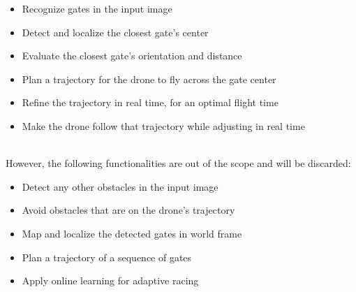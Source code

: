 \begin{itemize}
	\item{Recognize gates in the input image}
	\item{Detect and localize the closest gate's center}
	\item{Evaluate the closest gate's orientation and distance}
	\item{Plan a trajectory for the drone to fly across the gate center}
	\item{Refine the trajectory in real time, for an optimal flight time}
	\item{Make the drone follow that trajectory while adjusting in real time}
\end{itemize}
~\\
However, the following functionalities are out of the scope and will be
discarded:

\begin{itemize}
	\item{Detect any other obstacles in the input image}
	\item{Avoid obstacles that are on the drone's trajectory}
	\item{Map and localize the detected gates in world frame}
	\item{Plan a trajectory of a sequence of gates}
	\item{Apply online learning for adaptive racing}
\end{itemize}
